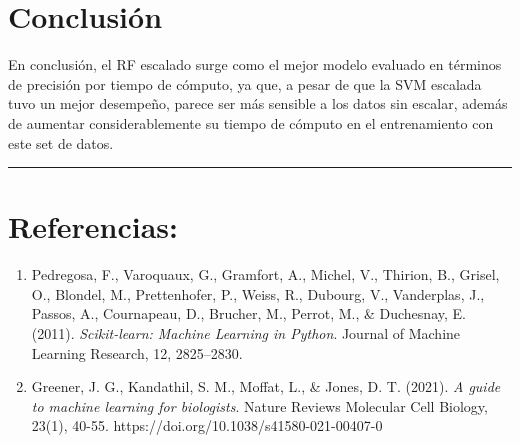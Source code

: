 \documentclass[
  10pt,
]{article}
\begin{document}
\section{Conclusión}\label{conclusiuxf3n}

En conclusión, el RF escalado surge como el mejor modelo evaluado en
términos de precisión por tiempo de cómputo, ya que, a pesar de que la
SVM escalada tuvo un mejor desempeño, parece ser más sensible a los
datos sin escalar, además de aumentar considerablemente su tiempo de
cómputo en el entrenamiento con este set de datos.

\begin{center}\rule{0.5\linewidth}{0.5pt}\end{center}

\section{Referencias:}\label{referencias}

\begin{enumerate}
\def\labelenumi{\arabic{enumi}.}
\item
  Pedregosa, F., Varoquaux, G., Gramfort, A., Michel, V., Thirion, B.,
  Grisel, O., Blondel, M., Prettenhofer, P., Weiss, R., Dubourg, V.,
  Vanderplas, J., Passos, A., Cournapeau, D., Brucher, M., Perrot, M.,
  \& Duchesnay, E. (2011). \emph{Scikit-learn: Machine Learning in
  Python}. Journal of Machine Learning Research, 12, 2825--2830.
\item
  Greener, J. G., Kandathil, S. M., Moffat, L., \& Jones, D. T. (2021).
  \emph{A guide to machine learning for biologists}. Nature Reviews
  Molecular Cell Biology, 23(1), 40-55.
  https://doi.org/10.1038/s41580-021-00407-0
\end{enumerate}
\end{document}

